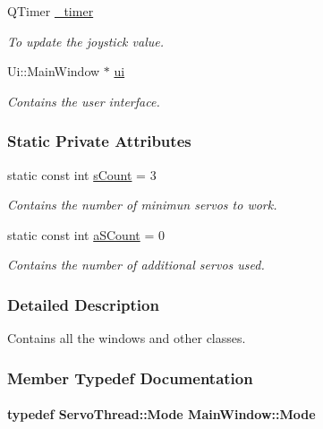 \begin{DoxyCompactItemize}
Q\+Timer \hyperlink{a00005_a254b03b878cfda75c1c411a2f8568d33}{\+\_\+timer}
\begin{DoxyCompactList}\small\item\em To update the joystick value. \end{DoxyCompactList}\item 
Ui\+::\+Main\+Window $\ast$ \hyperlink{a00005_a35466a70ed47252a0191168126a352a5}{ui}
\begin{DoxyCompactList}\small\item\em Contains the user interface. \end{DoxyCompactList}\end{DoxyCompactItemize}
\subsubsection*{Static Private Attributes}
\begin{DoxyCompactItemize}
\item 
static const int \hyperlink{a00005_a646727b1c45c72638325adfd460649c0}{s\+Count} = 3
\begin{DoxyCompactList}\small\item\em Contains the number of minimun servos to work. \end{DoxyCompactList}\item 
static const int \hyperlink{a00005_a42c44af9c0eebc33f4e81f02e15b0461}{a\+S\+Count} = 0
\begin{DoxyCompactList}\small\item\em Contains the number of additional servos used. \end{DoxyCompactList}\end{DoxyCompactItemize}


\subsubsection{Detailed Description}
Contains all the windows and other classes. 

\subsubsection{Member Typedef Documentation}
\hypertarget{a00005_a372482d77430e41c5483ab8605eece9d}{}
\paragraph[{Mode}]{\setlength{\rightskip}{0pt plus 5cm}typedef {\bf Servo\+Thread\+::\+Mode} {\bf Main\+Window\+::\+Mode}\hspace{0.3cm}{\ttfamily [private]}}\label{a00005_a372482d77430e41c5483ab8605eece9d}


